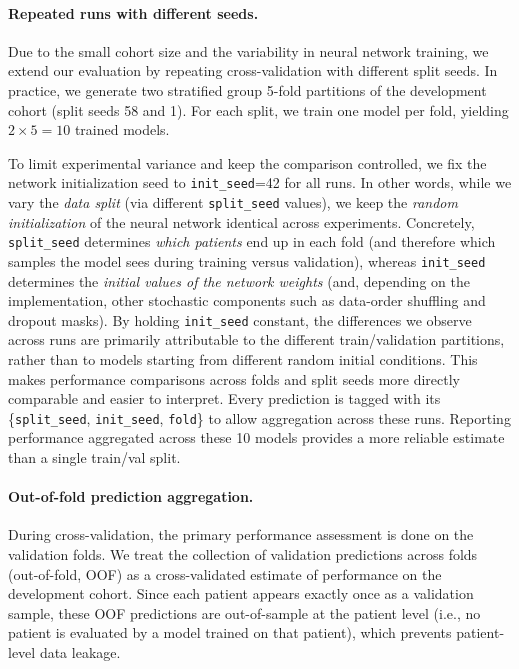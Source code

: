 \paragraph{Repeated runs with different seeds.}
Due to the small cohort size and the variability in neural network training, we extend our evaluation by repeating cross-validation with different split seeds. In practice, we generate two stratified group 5-fold partitions of the development cohort (split seeds 58 and 1). For each split, we train one model per fold, yielding $2\times 5 = 10$ trained models.

To limit experimental variance and keep the comparison controlled, we fix the network initialization seed to \texttt{init\_seed}=42 for all runs. In other words, while we vary the \emph{data split} (via different \texttt{split\_seed} values), we keep the \emph{random initialization} of the neural network identical across experiments. Concretely, \texttt{split\_seed} determines \emph{which patients} end up in each fold (and therefore which samples the model sees during training versus validation), whereas \texttt{init\_seed} determines the \emph{initial values of the network weights} (and, depending on the implementation, other stochastic components such as data-order shuffling and dropout masks). By holding \texttt{init\_seed} constant, the differences we observe across runs are primarily attributable to the different train/validation partitions, rather than to models starting from different random initial conditions. This makes performance comparisons across folds and split seeds more directly comparable and easier to interpret. Every prediction is tagged with its \{\texttt{split\_seed}, \texttt{init\_seed}, \texttt{fold}\} to allow aggregation across these runs. Reporting performance aggregated across these 10 models provides a more reliable estimate than a single train/val split.

\paragraph{Out-of-fold prediction aggregation.}
During cross-validation, the primary performance assessment is done on the validation folds. We treat the collection of validation predictions across folds (out-of-fold, OOF) as a cross-validated estimate of performance on the development cohort. Since each patient appears exactly once as a validation sample, these OOF predictions are out-of-sample at the patient level (i.e., no patient is evaluated by a model trained on that patient), which prevents patient-level data leakage.

